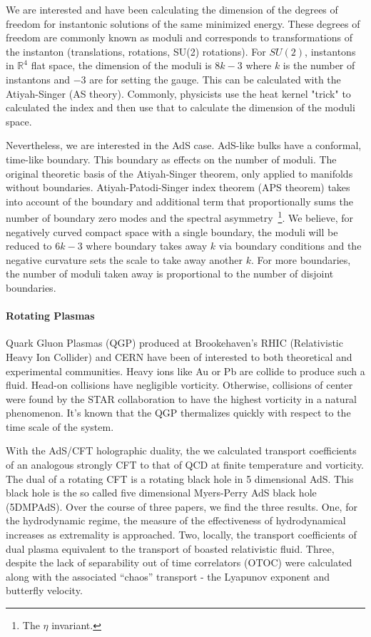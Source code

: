 \documentclass[12pt]{article}
\begin{document}
We are interested and have been calculating the dimension of the degrees of freedom for instantonic solutions of the same minimized energy.
%
These degrees of freedom are commonly known as moduli and corresponds to transformations of the instanton (translations, rotations, SU(2) rotations).
%
For $SU(2)$, instantons in $\mathds{R}^4$ flat space, the dimension of the moduli is $8k - 3$ where $k$ is the number of instantons and $-3$ are for setting the gauge.
%
This can be calculated with the Atiyah-Singer (AS theory).
%
Commonly, physicists use the heat kernel "trick" to calculated the index and then use that to calculate the dimension of the moduli space.

Nevertheless, we are interested in the AdS case. 
%
AdS-like bulks have a conformal, time-like boundary.
%
This boundary as effects on the number of moduli.
%
The original theoretic basis of the Atiyah-Singer theorem, only applied to manifolds without boundaries. 
%
Atiyah-Patodi-Singer index theorem (APS theorem) takes into account of the boundary and additional term that proportionally sums the number of boundary zero modes and the spectral asymmetry\
  \footnote{The $\eta$ invariant.}.
We believe, for negatively curved compact space with a single boundary, the moduli will be reduced to $6k - 3$ where boundary takes away $k$ via boundary conditions and the negative curvature sets the scale to take away another $k$.
%
For more boundaries, the number of moduli taken away is proportional to the number of disjoint boundaries.

\paragraph{Rotating Plasmas}

Quark Gluon Plasmas (QGP) produced at Brookehaven's RHIC (Relativistic Heavy Ion Collider) and CERN have been of interested to both theoretical and experimental communities.
%
Heavy ions like Au or Pb are collide to produce such a fluid.
%
Head-on collisions have negligible vorticity.
%
Otherwise, collisions of center were found by the STAR collaboration to have the highest vorticity in a natural phenomenon.
%
It's known that the QGP thermalizes quickly with respect to the time scale of the system.

With the AdS/CFT holographic duality, the we calculated transport coefficients of an analogous strongly CFT to that of QCD at finite temperature and vorticity.
%
The dual of a rotating CFT is a rotating black hole in 5 dimensional AdS. 
%
This black hole is the so called five dimensional Myers-Perry AdS black hole (5DMPAdS).
%
Over the course of three papers, we find the three results. 
%
One, for the hydrodynamic regime, the measure of the effectiveness of hydrodynamical increases as extremality is approached.
%
Two, locally, the transport coefficients of dual plasma equivalent to the transport of boasted relativistic fluid.
%
Three, despite the lack of separability out of time correlators (OTOC) were calculated along with the associated ``chaos'' transport - the Lyapunov exponent and butterfly velocity.
%
\end{document}
